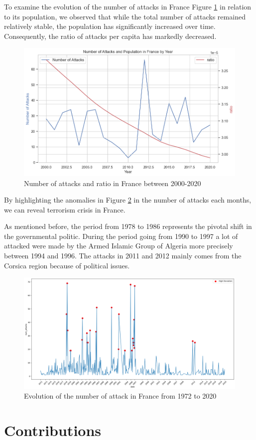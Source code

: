 \documentclass{article}
\begin{document}
To examine the evolution of the number of attacks in France Figure \ref{fig:ratio_fr} in relation to its population\cite{WorldBankPopulation}, we observed that while the total number of attacks remained relatively stable, the population has significantly increased over time. Consequently, the ratio of attacks per capita has markedly decreased.

\begin{figure}[!htb]
    \centering
    \includegraphics[width=0.5\linewidth]{img/ratio_fr.png}
    \caption{Number of attacks and ratio in France between 2000-2020}
    \label{fig:ratio_fr}
\end{figure}


By highlighting the anomalies in Figure \ref{fig:anomaly-fr} in the number of attacks each months, we can reveal terrorism crisis in France.

As mentioned before, the period from 1978 to 1986 represents the pivotal shift in the governmental politic. During the period going from 1990 to 1997 a lot of attacked were made by the Armed Islamic Group of Algeria more precisely between 1994 and 1996. The attacks in 2011 and 2012 mainly comes from the Corsica region because of political issues.

\begin{figure}[!htb]
    \centering
    \includegraphics[width=0.75\linewidth]{img//Anomaly/france_anomaly.png}
    \caption{Evolution of the number of attack in France from 1972 to 2020}
    \label{fig:anomaly-fr}
\end{figure}


\newpage
\section{Contributions}
\end{document}
